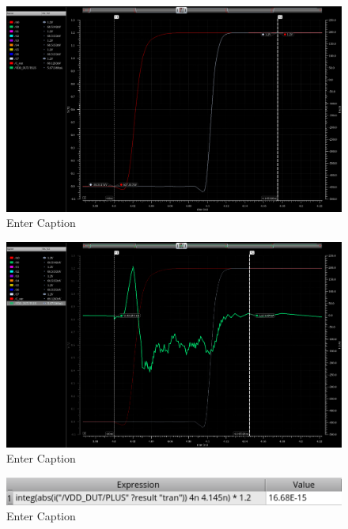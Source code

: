 \documentclass[12pt,letterpaper]{article}
\begin{document}
\begin{figure}[H]
    \centering
    \includegraphics[width=1\linewidth]{writeup//figures//baseline//active_energy/avg_switching_energy_signals.png}
    \caption{Enter Caption}
\end{figure}

\begin{figure}[H]
    \centering
    \includegraphics[width=\linewidth]{writeup//figures//baseline//active_energy/avg_switching_energy_current.png}
    \caption{Enter Caption}
\end{figure}

\begin{figure}[H]
    \centering
    \includegraphics[width=0.5\linewidth]{writeup//figures//baseline//active_energy/avg_switching_energy_value.png}
    \caption{Enter Caption}
\end{figure}
\end{document}
